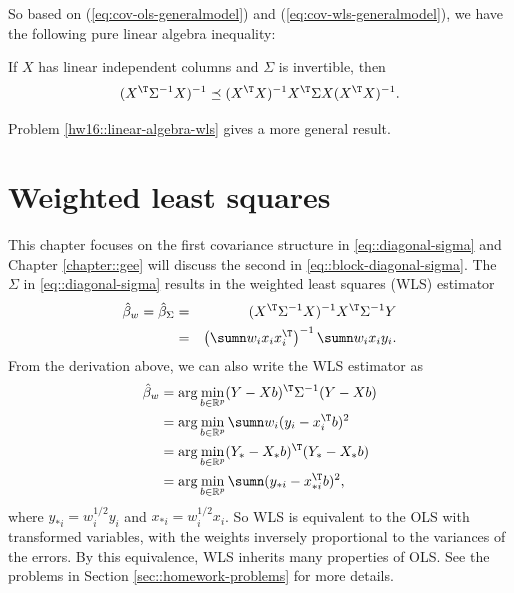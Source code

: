 So based on
(\ref{eq:cov-ols-generalmodel}) and (\ref{eq:cov-wls-generalmodel}),
we have the following pure linear algebra inequality:
\begin{corollary}\label{corollary::WLS-linear-algebra}
If $X$ has linear independent columns and $\Sigma$ is invertible, then 
\[
(X^{\T}\Sigma^{-1}X)^{-1}\preceq(X^{\T}X)^{-1}X^{\T}\Sigma X(X^{\T}X)^{-1}.
\]
\end{corollary}

Problem \ref{hw16::linear-algebra-wls} gives a more general result. 


\section{Weighted least squares}


This chapter focuses on the first covariance structure in \eqref{eq::diagonal-sigma} and Chapter \ref{chapter::gee} will discuss the second in \eqref{eq::block-diagonal-sigma}.  The $\Sigma$ in \eqref{eq::diagonal-sigma} results in the weighted least squares (WLS) estimator
\begin{eqnarray*}
\hat{\beta}_{w}  =\hat{\beta}_{\Sigma}
&=& (X^{\T}\Sigma^{-1}X)^{-1}X^{\T}\Sigma^{-1}Y \\
&=&\left(\sumn w_{i}x_{i}x_{i}^{\T}\right)^{-1}\sumn w_{i}x_{i}y_{i}.
\end{eqnarray*}
From the derivation above, we can also write the WLS estimator as
\begin{align*}
\hat{\beta}_{w}  
 & =\arg\min_{b\in \mathbb{R}^p}(Y-Xb)^{\T}\Sigma^{-1}(Y-Xb) \\
&  =\arg\min_{b\in \mathbb{R}^p}\sumn w_{i}(y_{i}-x_{i}^{\T}b)^{2}\\
  &=\arg\min_{b\in \mathbb{R}^p}( Y_*  - X_*  b)^{\T} ( Y_* -  X_* b)  \\
&  =\arg\min_{b\in \mathbb{R}^p}\sumn( y_{*i}  -x_{*i}^{\T} b)^{2},
\end{align*}
where $y_{*i} =w_{i}^{1/2}y_{i}$ and $x_{*i} =w_{i}^{1/2}x_{i}$. So
WLS is equivalent to the OLS with transformed variables, with the weights inversely proportional to the variances of the errors. 
By this equivalence, WLS inherits many properties of OLS. See the problems in Section \ref{sec::homework-problems} for more details. 




